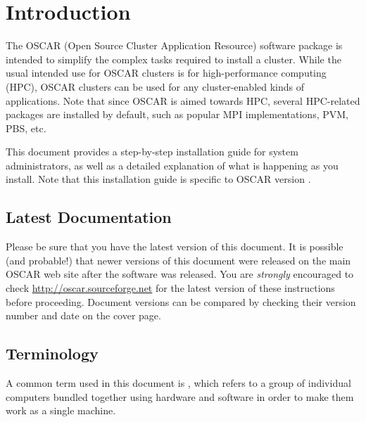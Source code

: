 %
% 
%
%
%

\section{Introduction}

The OSCAR (Open Source Cluster Application Resource) software package
is intended to simplify the complex tasks required to install a
cluster.  While the usual intended use for OSCAR clusters is for
high-performance computing (HPC), OSCAR clusters can be used for any
cluster-enabled kinds of applications.  Note that since OSCAR is aimed
towards HPC, several HPC-related packages are installed by default,
such as popular MPI implementations, PVM, PBS, etc.

This document provides a step-by-step installation guide for system
administrators, as well as a detailed explanation of what is happening
as you install.  Note that this installation guide is specific to
OSCAR version \oscarversion.  


\subsection{Latest Documentation}

Please be sure that you have the latest version of this document.  It
is possible (and probable!) that newer versions of this document were
released on the main OSCAR web site after the software was
released. You are {\em strongly} encouraged to check
\url{http://oscar.sourceforge.net} for the latest version of these
instructions before proceeding.  Document versions can be compared by
checking their version number and date on the cover page.


\subsection{Terminology}

A common term used in this document is , which refers to
a group of individual computers bundled together using hardware and
software in order to make them work as a single machine.

